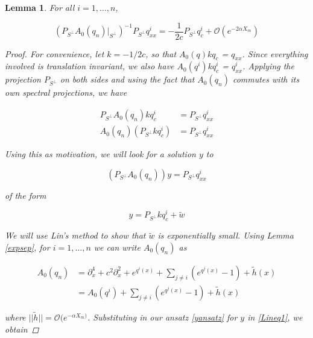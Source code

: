 \documentclass[12pt]{article}
\newtheorem{lemma}{Lemma}
\begin{document}
\begin{lemma}\label{Linsolve}
For all $i = 1, \dots, n$,
 
\begin{equation}
(P_{S^\perp} A_0(q_n)|_{S^\perp})^{-1} P_{S^\perp} q^i_{xx} = -\frac{1}{2c}P_{S^\perp} q^i_c
+ \mathcal{O}(e^{-2 \alpha X_m})
\end{equation}

\begin{proof}
For convenience, let $k = -1/2c$, so that $A_0(q) k q_c$ = $q_{xx}$. Since everything involved is translation invariant, we also have $A_0(q^i) k q^i_c$ = $q^i_{xx}$. Applying the projection $P_{S^\perp}$ on both sides and using the fact that $A_0(q_n)$ commutes with its own spectral projections, we have

\begin{align*}
P_{S^\perp} A_0(q_n) k q^i_c &= P_{S^\perp} q^i_{xx} \\
A_0(q_n) (P_{S^\perp} k q^i_c) &= P_{S^\perp} q^i_{xx}
\end{align*}

Using this as motivation, we will look for a solution $y$ to 

\begin{equation}\label{Lineq1}
(P_{S^\perp} A_0(q_n)) y = P_{S^\perp} q^i_{xx}
\end{equation}

of the form

\begin{equation}\label{yansatz}
y = P_{S^\perp} k q^i_c + \tilde{w}
\end{equation}

We will use Lin's method to show that $\tilde{w}$ is exponentially small. Using Lemma \ref{expsep}, for $i = 1, \dots, n$ we can write $A_0(q_n)$ as 

\begin{align}\label{A0expansion} 
A_0(q_n) &= \partial_x^4 + c^2 \partial_x^2 + e^{q^i(x)} + \sum_{j \neq i} (e^{q^j(x)} - 1) + \tilde{h}(x) \\
&= A_0(q^i) + \sum_{j \neq i} (e^{q^j(x)} - 1) + \tilde{h}(x) \nonumber
\end{align}

where $||\tilde{h}|| = \mathcal{O}(e^{-\alpha X_m)}$. Substituting in our ansatz \eqref{yansatz} for $y$ in \eqref{Lineq1}, we obtain


\end{proof}
\end{lemma}
\end{document}
